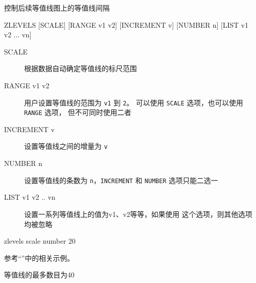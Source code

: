 \label{cmd:zlevels}

控制后续等值线图上的等值线间隔

\begin{SACSTX}
ZLEVELS [SCALE] [RANGE v1 v2] [INCREMENT v] [NUMBER n] [LIST v1 v2 ... vn]
\end{SACSTX}

\begin{description}
\item [SCALE] 根据数据自动确定等值线的标尺范围
\item [RANGE v1 v2] 用户设置等值线的范围为 \texttt{v1} 到 \texttt{2}。
    可以使用 \texttt{SCALE} 选项，也可以使用 \texttt{RANGE} 选项，
    但不可同时使用二者
\item [INCREMENT v] 设置等值线之间的增量为 \texttt{v}
\item [NUMBER n] 设置等值线的条数为 \texttt{n}，\texttt{INCREMENT} 和
    \texttt{NUMBER} 选项只能二选一
\item [LIST v1 v2 .. vn] 设置一系列等值线上的值为v1、v2等等，如果使用
    这个选项，则其他选项均被忽略
\end{description}

\begin{SACDFT}
zlevels scale number 20
\end{SACDFT}

参考``''中的相关示例。

等值线的最多数目为40
